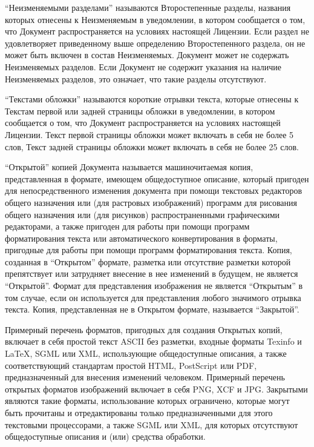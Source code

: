 \enquote{Неизменяемыми разделами} называются Второстепенные разделы,
названия которых отнесены к Неизменяемым в уведомлении, в котором
сообщается о том, что Документ распространяется на условиях настоящей
Лицензии. Если раздел не удовлетворяет приведенному выше определению
Второстепенного раздела, он не может быть включен в состав
Неизменяемых. Документ может не содержать Неизменяемых разделов. Если
Документ не содержит указания на наличие Неизменяемых разделов, это
означает, что такие разделы отсутствуют.

\enquote{Текстами обложки} называются короткие отрывки текста, которые
отнесены к Текстам первой или задней страницы обложки в уведомлении, в
котором сообщается о том, что Документ распространяется на условиях
настоящей Лицензии. Текст первой страницы обложки может включать в
себя не более 5 слов, Текст задней страницы обложки может включать в
себя не более 25 слов.

\enquote{Открытой} копией Документа называется машиночитаемая копия,
представленная в формате, имеющем общедоступное описание, который
пригоден для непосредственного изменения документа при помощи
текстовых редакторов общего назначения или (для растровых изображений)
программ для рисования общего назначения или (для рисунков)
распространенными графическими редакторами, а также пригоден для
работы при помощи программ форматирования текста или автоматического
конвертирования в форматы, пригодные для работы при помощи программ
форматирования текста. Копия, созданная в \enquote{Открытом} формате,
разметка или отсутствие разметки которой препятствует или затрудняет
внесение в нее изменений в будущем, не является
\enquote{Открытой}. Формат для представления изображения не является
\enquote{Открытым} в том случае, если он используется для
представления любого значимого отрывка текста. Копия, представленная
не в Открытом формате, называется \enquote{Закрытой}.

Примерный перечень форматов, пригодных для создания Открытых копий,
включает в себя простой текст ASCII без разметки, входные форматы
Texinfo и LaTeX, SGML или XML, использующие общедоступные описания, а
также соответствующий стандартам простой HTML, PostScript или PDF,
предназначенный для внесения изменений человеком. Примерный перечень
открытых форматов изображений включает в себя PNG, XCF и
JPG. Закрытыми являются такие форматы, использование которых
ограничено, которые могут быть прочитаны и отредактированы только
предназначенными для этого текстовыми процессорами, а также SGML или
XML, для которых отсутствуют общедоступные описания и (или) средства
обработки.

